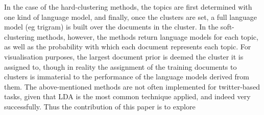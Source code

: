 \documentclass{article}
\begin{document}
 In the case of the hard-clustering methods, the topics are first determined with one kind of language model, and finally, once the clusters are set, a full language model (eg trigram) is built over the documents in the cluster. In the soft-clustering methods, however, the methods return language models for each topic, as well as the probability with which each document represents each topic. For visualisation purposes, the largest document prior is deemed the cluster it is assigned to, though in reality the assignment of the training documents to clusters is immaterial to the performance of the language models derived from them.
The above-mentioned methods are not often implemented for twitter-based tasks, given that LDA is the most common technique applied, and indeed very successfully. Thus the contribution of this paper is to explore

\end{document}
